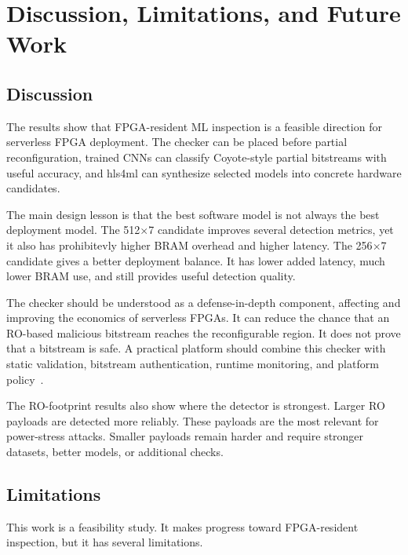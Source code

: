 \chapter{Discussion, Limitations, and Future Work}
\label{ch:discussion}

\section{Discussion}
\label{sec:discussion}

The results show that FPGA-resident ML inspection is a feasible direction for serverless FPGA deployment. The checker can be placed before partial reconfiguration, trained CNNs can classify Coyote-style partial bitstreams with useful accuracy, and hls4ml can synthesize selected models into concrete hardware candidates.

The main design lesson is that the best software model is not always the best deployment model. The 512$\times$7 candidate improves several detection metrics, yet it also has prohibitevly higher BRAM overhead and higher latency. The 256$\times$7 candidate gives a better deployment balance. It has lower added latency, much lower BRAM use, and still provides useful detection quality.

The checker should be understood as a defense-in-depth component, affecting and improving the economics of serverless FPGAs. It can reduce the chance that an RO-based malicious bitstream reaches the reconfigurable region. It does not prove that a bitstream is safe. A practical platform should combine this checker with static validation, bitstream authentication, runtime monitoring, and platform policy~\cite{jin2020security,zhang2019recent,ahmed2022multitenant}.

The RO-footprint results also show where the detector is strongest. Larger RO payloads are detected more reliably. These payloads are the most relevant for power-stress attacks. Smaller payloads remain harder and require stronger datasets, better models, or additional checks.

\section{Limitations}
\label{sec:limitations}

This work is a feasibility study. It makes progress toward FPGA-resident inspection, but it has several limitations.

